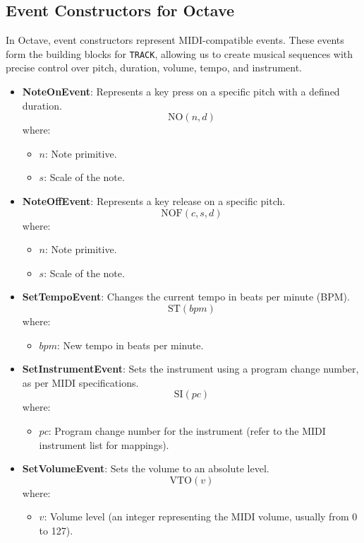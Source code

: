 \documentclass[letterpaper,12pt]{article}
\begin{document}
\subsection{Event Constructors for Octave} \label{event constructor}

In Octave, event constructors represent MIDI-compatible events. These events form the building blocks for \texttt{TRACK}, allowing us to create musical sequences with precise control over pitch, duration, volume, tempo, and instrument.

\begin{itemize}
    \item \textbf{NoteOnEvent}: Represents a key press on a specific pitch with a defined duration.
    \[
    \text{NO}(n, d)
    \]
    where:
    \begin{itemize}
        \item \( n \): Note primitive.
        \item \( s \): Scale of the note.
    \end{itemize}

    \item \textbf{NoteOffEvent}: Represents a key release on a specific pitch.
    \[
    \text{NOF}(c, s, d)
    \]
    where:
    \begin{itemize}
        \item \( n \): Note primitive.
        \item \( s \): Scale of the note.
    \end{itemize}

    \item \textbf{SetTempoEvent}: Changes the current tempo in beats per minute (BPM).
    \[
    \text{ST}(bpm)
    \]
    where:
    \begin{itemize}
        \item \( bpm \): New tempo in beats per minute.
    \end{itemize}

    \item \textbf{SetInstrumentEvent}: Sets the instrument using a program change number, as per MIDI specifications.
    \[
    \text{SI}(pc)
    \]
    where:
    \begin{itemize}
        \item \( pc \): Program change number for the instrument (refer to the MIDI instrument list for mappings).
    \end{itemize}

    \item \textbf{SetVolumeEvent}: Sets the volume to an absolute level.
    \[
    \text{VTO}(v)
    \]
    where:
    \begin{itemize}
        \item \( v \): Volume level (an integer representing the MIDI volume, usually from 0 to 127).
    \end{itemize}

\end{itemize}
\end{document}
